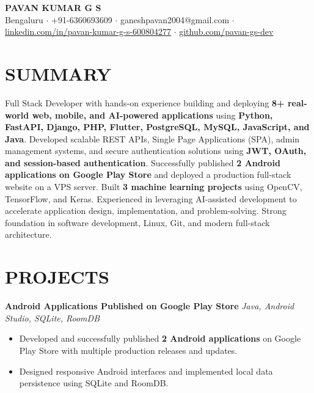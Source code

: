\documentclass[10pt,a4paper]{article}
\begin{document}

\begin{center}
{\Huge \textbf{PAVAN KUMAR G S}}\\[2pt]

Bengaluru $\cdot$
+91-6360693609 $\cdot$
ganeshpavan2004@gmail.com $\cdot$
\href{https://linkedin.com/in/pavan-kumar-g-s-600804277}{linkedin.com/in/pavan-kumar-g-s-600804277}
$\cdot$
\href{https://github.com/pavan-gs-dev}{github.com/pavan-gs-dev}

\end{center}


\section*{SUMMARY}

Full Stack Developer with hands-on experience building and deploying \textbf{8+ real-world web, mobile, and AI-powered applications} using \textbf{Python, FastAPI, Django, PHP, Flutter, PostgreSQL, MySQL, JavaScript, and Java}. Developed scalable REST APIs, Single Page Applications (SPA), admin management systems, and secure authentication solutions using \textbf{JWT, OAuth, and session-based authentication}. Successfully published \textbf{2 Android applications on Google Play Store} and deployed a production full-stack website on a VPS server. Built \textbf{3 machine learning projects} using OpenCV, TensorFlow, and Keras. Experienced in leveraging AI-assisted development to accelerate application design, implementation, and problem-solving. Strong foundation in software development, Linux, Git, and modern full-stack architecture.


\section*{PROJECTS}

\textbf{Android Applications Published on Google Play Store}
\hfill \textit{Java, Android Studio, SQLite, RoomDB}

\begin{itemize}[leftmargin=*,itemsep=0pt,topsep=0pt]
\item Developed and successfully published \textbf{2 Android applications} on Google Play Store with multiple production releases and updates.
\item Designed responsive Android interfaces and implemented local data persistence using SQLite and RoomDB.
\end{itemize}
\end{document}
